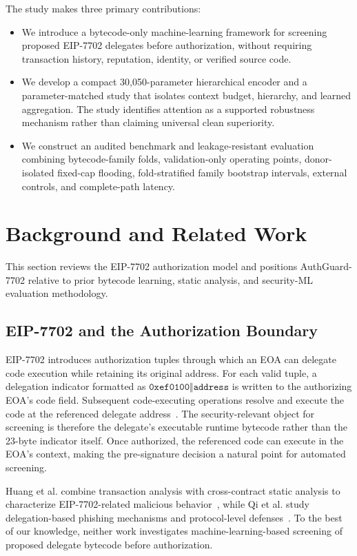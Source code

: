 \documentclass[conference]{IEEEtran}
\newcommand{\code}[1]{\texttt{#1}}
\begin{document}
The study makes three primary contributions:
\begin{itemize}
    \item We introduce a bytecode-only machine-learning framework for screening proposed EIP-7702 delegates before authorization, without requiring transaction history, reputation, identity, or verified source code.
    \item We develop a compact 30,050-parameter hierarchical encoder and a parameter-matched study that isolates context budget, hierarchy, and learned aggregation. The study identifies attention as a supported robustness mechanism rather than claiming universal clean superiority.
    \item We construct an audited benchmark and leakage-resistant evaluation combining bytecode-family folds, validation-only operating points, donor-isolated fixed-cap flooding, fold-stratified family bootstrap intervals, external controls, and complete-path latency.
\end{itemize}

\section{Background and Related Work}
\label{sec:related}
This section reviews the EIP-7702 authorization model and positions AuthGuard-7702 relative to prior bytecode learning, static analysis, and security-ML evaluation methodology.

\subsection{EIP-7702 and the Authorization Boundary}

EIP-7702 introduces authorization tuples through which an EOA can delegate code execution while retaining its original address. For each valid tuple, a delegation indicator formatted as $\code{0xef0100}\Vert\code{address}$ is written to the authorizing EOA's code field. Subsequent code-executing operations resolve and execute the code at the referenced delegate address~\cite{eip7702}. The security-relevant object for screening is therefore the delegate's executable runtime bytecode rather than the 23-byte indicator itself. Once authorized, the referenced code can execute in the EOA's context, making the pre-signature decision a natural point for automated screening.

Huang et al. combine transaction analysis with cross-contract static analysis to characterize EIP-7702-related malicious behavior~\cite{huang2026darkside}, while Qi et al. study delegation-based phishing mechanisms and protocol-level defenses~\cite{qi2025eip7702}. To the best of our knowledge, neither work investigates machine-learning-based screening of proposed delegate bytecode before authorization.
\end{document}
